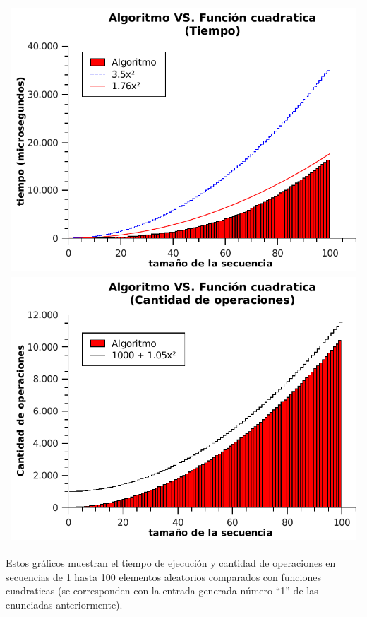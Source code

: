 \newpage
	\begin{table}[h!] %
		\centering %
			\begin{tabular}{c}
				\includegraphics[scale=0.7]{../ej1/graficos/tiempo100.pdf} \\
				\includegraphics[scale=0.7]{../ej1/graficos/operaciones100.pdf}
				\end{tabular}
				\label{tiempoEj1a} %
	\end{table}

Estos gráficos muestran el tiempo de ejecución y cantidad de operaciones en secuencias de 1 hasta 100 elementos aleatorios comparados con funciones cuadraticas (se corresponden con la entrada generada número ``1''  de las enunciadas anteriormente).

